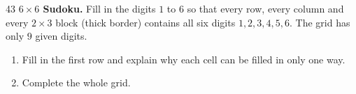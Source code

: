 \begin{probbox}{43}{}
\textbf{$6\times 6$ Sudoku.} Fill in the digits $1$ to $6$ so that every row, every column and every $2\times 3$ block (thick border)
contains all six digits $1, 2, 3, 4, 5, 6$. The grid has only $9$ given digits.
\begin{enumerate}[label=\alph*),leftmargin=1.6em,itemsep=1pt,topsep=2pt]
  \item Fill in the first row and explain why each cell can be filled in only one way.
  \item Complete the whole grid.
\end{enumerate}
\begin{figC}
\end{figC}
\end{probbox}
